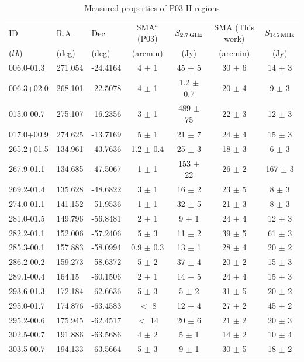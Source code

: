 \documentclass[useAMS,usenatbib]{mn2e}
\begin{document}
\begin{table}
\caption{Measured properties of P03 {H} regions}
\begin{tabular}{lllcccc}
\hline
ID & R.A. & Dec & SMA$^a$ (P03) & $S_{2.7\,{\rm GHz}}$ & SMA (This work) &  $S_{145\,{\rm MHz}}$	 \\
($l\,b$)   & (deg) & (deg) & (arcmin) & (Jy) & (arcmin) & (Jy) \\
\hline
006.0-01.3	&	271.054	&	-24.4164	&	4	$\pm$	1	&	45	$\pm$	5	&	30	$\pm$	6	&	14	$\pm$	3	\\
006.3+02.0	&	268.101	&	-22.5078	&	4	$\pm$	1	&	1.2	$\pm$	0.7	&	20	$\pm$	4	&	9	$\pm$	3	\\
015.0-00.7	&	275.107	&	-16.2356	&	3	$\pm$	1	&	489	$\pm$	75	&	22	$\pm$	3	&	12	$\pm$	3	\\
017.0+00.9	&	274.625	&	-13.7169	&	5	$\pm$	1	&	21	$\pm$	7	&	24	$\pm$	4	&	15	$\pm$	3	\\
265.2+01.5	&	134.961	&	-43.7636	&	1.2	$\pm$	0.4	&	25	$\pm$	3	&	18	$\pm$	3	&	6	$\pm$	3	\\
267.9-01.1	&	134.685	&	-47.5067	&	1	$\pm$	1	&	153	$\pm$	22	&	26	$\pm$	2	&	167	$\pm$	3	\\
269.2-01.4	&	135.628	&	-48.6822	&	3	$\pm$	1	&	16	$\pm$	2	&	23	$\pm$	5	&	8	$\pm$	3	\\
274.0-01.1	&	141.152	&	-51.9536	&	1	$\pm$	1	&	32	$\pm$	5	&	21	$\pm$	3	&	8	$\pm$	3	\\
281.0-01.5	&	149.796	&	-56.8481	&	2	$\pm$	1	&	9	$\pm$	1	&	24	$\pm$	4	&	12	$\pm$	3	\\
282.2-01.1	&	152.006	&	-57.2406	&	5	$\pm$	3	&	11	$\pm$	2	&	39	$\pm$	5	&	61	$\pm$	3	\\
285.3-00.1	&	157.883	&	-58.0994	&	0.9	$\pm$	0.3	&	13	$\pm$	1	&	28	$\pm$	4	&	20	$\pm$	2	\\
286.2-00.2	&	159.273	&	-58.6372	&	5	$\pm$	2	&	37	$\pm$	4	&	20	$\pm$	2	&	15	$\pm$	3	\\
289.1-00.4	&	164.15	&	-60.1506	&	2	$\pm$	1	&	14	$\pm$	5	&	24	$\pm$	4	&	15	$\pm$	3	\\
293.6-01.3	&	172.184	&	-62.6636	&	5	$\pm$	3	&	5	$\pm$	2	&	31	$\pm$	5	&	20	$\pm$	2	\\
295.0-01.7	&	174.876	&	-63.4583	&		$<$	8	&	12	$\pm$	4	&	27	$\pm$	2	&	45	$\pm$	2	\\
295.2-00.6	&	175.945	&	-62.4517	&		$<$	14	&	20	$\pm$	6	&	21	$\pm$	2	&	20	$\pm$	3	\\
302.5-00.7	&	191.886	&	-63.5686	&	4	$\pm$	2	&	5	$\pm$	1	&	14	$\pm$	2	&	10	$\pm$	4	\\
303.5-00.7	&	194.133	&	-63.5664	&	5	$\pm$	3	&	9	$\pm$	1	&	30	$\pm$	5	&	18	$\pm$	2	\\

\end{tabular}
\end{table}
\end{document}
